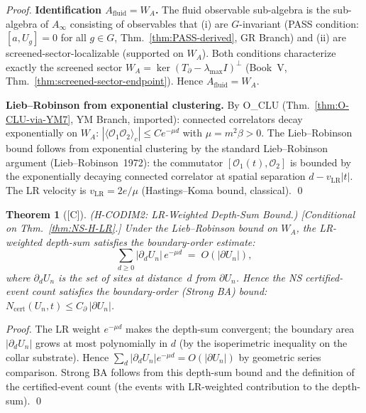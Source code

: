 \documentclass[12pt,oneside]{amsbook}
\theoremstyle{plain}
\newtheorem{theorem}{Theorem}[section]
\theoremstyle{definition}
\theoremstyle{remark}
\newcommand{\status}[1]{\textup{[#1]}}
\begin{document}
\begin{proof}
\textbf{Identification $A_{\mathrm{fluid}} = W_A$.}
The fluid observable sub-algebra is the sub-algebra of $A_\infty$
consisting of observables that (i) are $G$-invariant (PASS condition:
$[a, U_g] = 0$ for all $g \in G$, Thm.~\ref{thm:PASS-derived},
GR Branch) and (ii) are screened-sector-localizable (supported on
$W_A$). Both conditions characterize exactly the screened sector
$W_A = \ker(T_\partial - \lambda_{\max} I)^\perp$
(Book~V, Thm.~\ref{thm:screened-sector-endpoint}). Hence
$A_{\mathrm{fluid}} = W_A$.

\textbf{Lieb--Robinson from exponential clustering.}
By O\_CLU (Thm.~\ref{thm:O-CLU-via-YM7}, YM Branch, imported):
connected correlators decay exponentially on $W_A$:
$|\langle\mathcal{O}_1\mathcal{O}_2\rangle_c|
\leq C e^{-\mu d}$ with $\mu = m^2\beta > 0$.
The Lieb--Robinson bound follows from exponential clustering
by the standard Lieb--Robinson argument (Lieb--Robinson~1972):
the commutator $[\mathcal{O}_1(t), \mathcal{O}_2]$ is bounded
by the exponentially decaying connected correlator at spatial
separation $d - v_{\mathrm{LR}}|t|$. The LR velocity is
$v_{\mathrm{LR}} = 2e/\mu$ (Hastings--Koma bound, classical). \qed
\end{proof}

\begin{theorem}[\status{C}]\label{thm:NS-H-CODIM2}
\textup{(H-CODIM2: LR-Weighted Depth-Sum Bound.)}
\textup{[Conditional on Thm.~\ref{thm:NS-H-LR}.]}
Under the Lieb--Robinson bound on $W_A$, the LR-weighted depth-sum
satisfies the boundary-order estimate:
\[
 \sum_{d \geq 0} |\partial_d U_n|\, e^{-\mu d}
 \;=\; O(|\partial U_n|),
\]
where $\partial_d U_n$ is the set of sites at distance~$d$ from
$\partial U_n$. Hence the NS certified-event count satisfies
the boundary-order (Strong BA) bound:
$N_{\mathrm{cert}}(U_n, t) \leq C_\partial\,|\partial U_n|$.
\end{theorem}

\begin{proof}
The LR weight $e^{-\mu d}$ makes the depth-sum convergent; the
boundary area $|\partial_d U_n|$ grows at most polynomially in $d$
(by the isoperimetric inequality on the collar substrate). Hence
$\sum_d |\partial_d U_n| e^{-\mu d} = O(|\partial U_n|)$ by
geometric series comparison. Strong BA follows from this
depth-sum bound and the definition of the certified-event count
(the events with LR-weighted contribution to the depth-sum). \qed
\end{proof}
\end{document}
